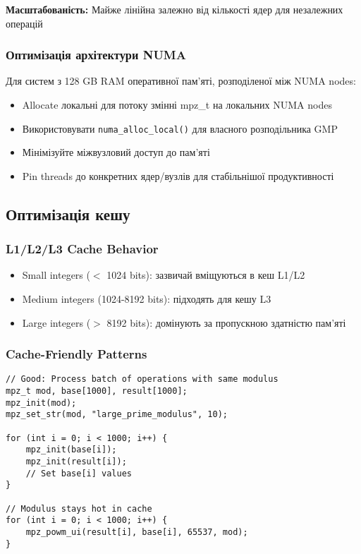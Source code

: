 \textbf{Масштабованість:} Майже лінійна залежно від кількості ядер для незалежних операцій

\subsubsection{Оптимізація архітектури NUMA}
Для систем з 128 GB RAM оперативної пам'яті, розподіленої між NUMA nodes:
\begin{itemize}
    \item Allocate локальні для потоку змінні mpz\_t на локальних NUMA nodes
    \item Використовувати \texttt{numa\_alloc\_local()} для власного розподільника GMP
    \item Мінімізуйте міжвузловий доступ до пам'яті
    \item Pin threads до конкретних ядер/вузлів для стабільнішої продуктивності
\end{itemize}

\subsection{Оптимізація кешу}

\subsubsection{L1/L2/L3 Cache Behavior}
\begin{itemize}
    \item Small integers ($<$ 1024 bits): зазвичай вміщуються в кеш L1/L2
    \item Medium integers (1024-8192 bits): підходять для кешу L3
    \item Large integers ($>$ 8192 bits): домінують за пропускною здатністю пам'яті
\end{itemize}

\subsubsection{Cache-Friendly Patterns}
\begin{verbatim}
// Good: Process batch of operations with same modulus
mpz_t mod, base[1000], result[1000];
mpz_init(mod);
mpz_set_str(mod, "large_prime_modulus", 10);

for (int i = 0; i < 1000; i++) {
    mpz_init(base[i]);
    mpz_init(result[i]);
    // Set base[i] values
}

// Modulus stays hot in cache
for (int i = 0; i < 1000; i++) {
    mpz_powm_ui(result[i], base[i], 65537, mod);
}
\end{verbatim}

